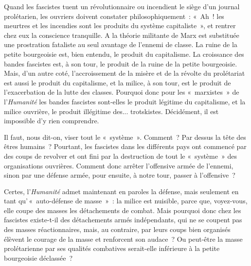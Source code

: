 \documentclass[french,twoside]{book} %
\begin{document}
Quand les fascistes tuent un révolutionnaire ou incendient le siège d’un journal prolétarien, les ouvriers doivent constater philosophiquement : « Ah ! les meurtres et les incendies sont les produits du système capitaliste », et rentrer chez eux la conscience tranquille. A la théorie militante de Marx est substituée une prostration fataliste au seul avantage de l’ennemi de classe. La ruine de la petite bourgeoisie est, bien entendu, le produit du capitalisme. La croissance des bandes fascistes est, à son tour, le produit de la ruine de la petite bourgeoisie. Mais, d’un autre coté, l’accroissement de la misère et de la révolte du prolétariat est aussi le produit du capitalisme, et la milice,  à son tour, est le produit de l’exacerbation de la lutte des classes. Pourquoi donc pour les « marxistes » de l’\emph{Humanité} les bandes fascistes sont-elles le produit légitime du capitalisme, et la milice ouvrière, le produit illégitime des... trotskistes. Décidément, il est impossible d’y rien comprendre.\par
Il faut, nous dit-on, viser tout le « système ». Comment ? Par dessus la tête des êtres humains ? Pourtant, les fascistes dans les différents pays ont commencé par des coups de revolver et ont fini par la destruction de tout le « système » des organisations ouvrières. Comment donc arrêter l’offensive armée de l’ennemi, sinon par une défense armée, pour ensuite, à notre tour, passer à l’offensive ?\par
Certes, l’\emph{Humanité} admet maintenant en paroles la défense, mais seulement en tant qu’ « auto-défense de masse » : la milice est nuisible, parce que, voyez-vous, elle coupe des masses les détachements de combat. Mais pourquoi donc chez les fascistes existe-t-il des détachements armés indépendants, qui ne se coupent pas des masses réactionnaires, mais, au contraire, par leurs coups bien organisés élèvent le courage de la masse et renforcent son audace ? Ou peut-être la masse prolétarienne par ses qualités combatives serait-elle inférieure à la petite bourgeoisie déclassée ?\par
\end{document}
